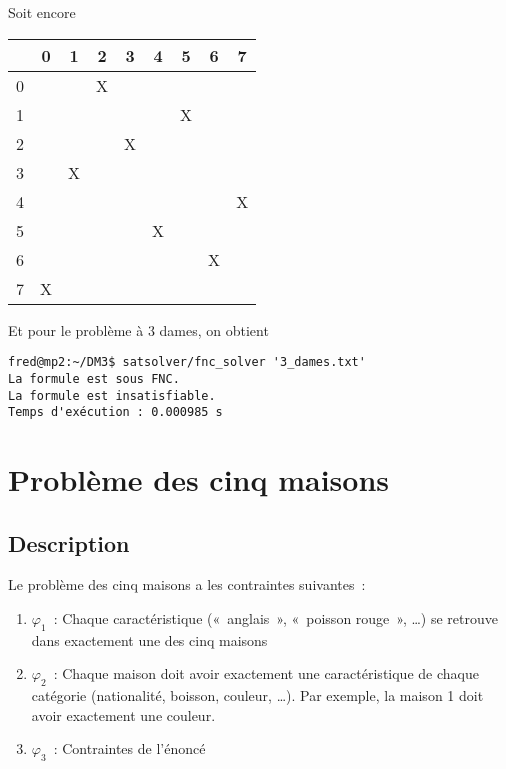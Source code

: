 Soit encore
\begin{center}
    \begin{tabular}{| c || *{8}{c |}}
    \hline
      & 0 & 1 & 2 & 3 & 4 & 5 & 6 & 7 \\
    \hline
    \hline
    0 &   &   & X &   &   &   &   &   \\
    \hline
    1 &   &   &   &   &   & X &   &   \\
    \hline
    2 &   &   &   & X &   &   &   &   \\
    \hline
    3 &   & X &   &   &   &   &   &   \\
    \hline
    4 &   &   &   &   &   &   &   & X \\
    \hline
    5 &   &   &   &   & X &   &   &   \\
    \hline
    6 &   &   &   &   &   &   & X &   \\
    \hline
    7 & X &   &   &   &   &   &   &   \\
    \hline
    \end{tabular}
\end{center}

Et pour le problème à 3 dames, on obtient
\begin{lstlisting}
fred@mp2:~/DM3$ satsolver/fnc_solver '3_dames.txt'
La formule est sous FNC.
La formule est insatisfiable.
Temps d'exécution : 0.000985 s
\end{lstlisting}


\section{Problème des cinq maisons}
\subsection{Description}
Le problème des cinq maisons a les contraintes suivantes~:
\begin{enumerate}
    \item $\varphi_1$~: Chaque caractéristique («~anglais~», «~poisson
        rouge~», …) se retrouve dans exactement une des cinq maisons
    \item $\varphi_2$~: Chaque maison doit avoir exactement une caractéristique de chaque
        catégorie (nationalité, boisson, couleur, …). Par exemple, la maison
        1 doit avoir exactement une couleur.
    \item $\varphi_3$~: Contraintes de l’énoncé
\end{enumerate}

